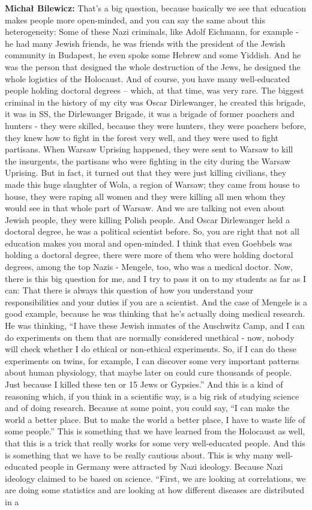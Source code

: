 \textbf{Michał Bilewicz:} That’s a big question, because basically we see that education makes people more open-minded, and you can say the same about this heterogeneity: Some of these Nazi criminals, like Adolf Eichmann, for example - he had many Jewish friends, he was friends with the president of the Jewish community in Budapest, he even spoke some Hebrew and some Yiddish. And he was the person that designed the whole destruction of the Jews, he designed the whole logistics of the Holocaust. And of course, you have many well-educated people holding doctoral degrees – which, at that time, was very rare. The biggest criminal in the history of my city was Oscar Dirlewanger, he created this brigade, it was in SS, the Dirlewanger Brigade, it was a brigade of former poachers and hunters - they were skilled, because they were hunters, they were poachers before, they knew how to fight in the forest very well, and they were used to fight partisans. When Warsaw Uprising happened, they were sent to Warsaw to kill the insurgents, the partisans who were fighting in the city during the Warsaw Uprising. But in fact, it turned out that they were just killing civilians, they made this huge slaughter of Wola, a region of Warsaw; they came from house to house, they were raping all women and they were killing all men whom they would see in that whole part of Warsaw. And we are talking not even about Jewish people, they were killing Polish people. And Oscar Dirlewanger held a doctoral degree, he was a political scientist before. So, you are right that not all education makes you moral and open-minded. I think that even Goebbels was holding a doctoral degree, there were more of them who were holding doctoral degrees, among the top Nazis - Mengele, too, who was a medical doctor. Now, there is this big question for me, and I try to pass it on to my students as far as I can: That there is always this question of how you understand your responsibilities and your duties if you are a scientist. And the case of Mengele is a good example, because he was thinking that he’s actually doing medical research. He was thinking, ``I have these Jewish inmates of the Auschwitz Camp, and I can do experiments on them that are normally considered unethical - now, nobody will check whether I do ethical or non-ethical experiments. So, if I can do these experiments on twins, for example, I can discover some very important patterns about human physiology, that maybe later on could cure thousands of people. Just because I killed these ten or 15 Jews or Gypsies.'' And this is a kind of reasoning which, if you think in a scientific way, is a big risk of studying science and of doing research. Because at some point, you could say, ``I can make the world a better place. But to make the world a better place, I have to waste life of some people.'' This is something that we have learned from the Holocaust as well, that this is a trick that really works for some very well-educated people. And this is something that we have to be really cautious about. This is why many well-educated people in Germany were attracted by Nazi ideology. Because Nazi ideology claimed to be based on science. ``First, we are  looking at correlations, we are doing some statistics and are looking at how different diseases are distributed in a 